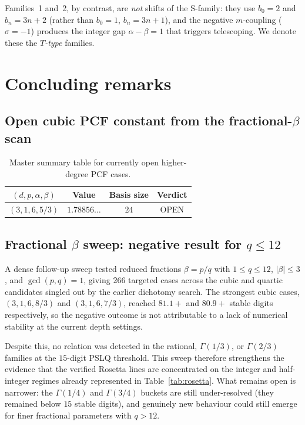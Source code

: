 \documentclass[11pt,a4paper]{article}
\theoremstyle{definition}
\theoremstyle{remark}
\begin{document}
Families~1 and~2, by contrast, are \emph{not} shifts of the S-family:
they use $b_0 = 2$ and $b_n = 3n + 2$ (rather than $b_0 = 1$, $b_n = 3n+1$),
and the negative $m$-coupling ($\sigma = -1$) produces the integer gap
$\alpha - \beta = 1$ that triggers telescoping.
We denote these the \emph{$T$-type} families.

\section{Concluding remarks}\label{sec:conclusion}

\subsection{Open cubic PCF constant from the fractional-$\beta$ scan}

\begin{table}[ht]
\centering
\caption{Master summary table for currently open higher-degree PCF cases.}
\label{tab:open-master-summary}
\begin{tabular}{cccc}
\toprule
$(d,p,\alpha,\beta)$ & Value & Basis size & Verdict \\
\midrule
$(3,1,6,5/3)$ & $1.78856\ldots$ & $24$ & OPEN \\
\bottomrule
\end{tabular}
\end{table}



\subsection{Fractional $\beta$ sweep: negative result for $q \le 12$}

A dense follow-up sweep tested reduced fractions $\beta = p/q$ with
$1 \le q \le 12$, $|\beta| \le 3$, and $\gcd(p,q)=1$, giving
266 targeted cases across the cubic and quartic candidates singled out by
the earlier dichotomy search.  The strongest cubic cases,
$(3,1,6,8/3)$ and $(3,1,6,7/3)$, reached $81.1{+}$ and $80.9{+}$ stable
digits respectively, so the negative outcome is not attributable to a lack
of numerical stability at the current depth settings.

Despite this, no relation was detected in the rational,
$\Gamma(1/3)$, or $\Gamma(2/3)$ families at the $15$-digit PSLQ threshold.
This sweep therefore strengthens the evidence that the verified Rosetta
lines are concentrated on the integer and half-integer regimes already
represented in Table~\ref{tab:rosetta}.  What remains open is narrower:
the $\Gamma(1/4)$ and $\Gamma(3/4)$ buckets are still under-resolved
(they remained below $15$ stable digits), and genuinely new behaviour could
still emerge for finer fractional parameters with $q>12$.
\end{document}
